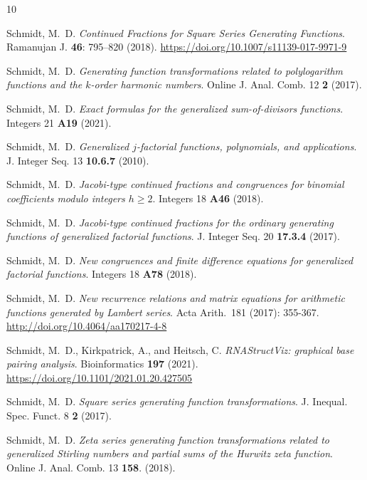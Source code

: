 \documentclass[10pt,reqno,letterpaper]{article}
\theoremstyle{plain}
\numberwithin{theorem}{section}
\theoremstyle{definition}
\newcounter{completeBibitemIncrementCtr}
\renewenvironment{thebibliography}[1]{
     \renewcommand{\refname}{} 
     
     \begin{oldthebibliography}{#1}
     \setlength{\itemsep}{0em}
     \setlength{\parskip}{0em}
     \setlength{\topsep}{0pt}
     \setlength{\partopsep}{0pt}
     \setcounter{enumiv}{\value{completeBibitemIncrementCtr}}
     \footnotesize 
}
{
     \setcounter{completeBibitemIncrementCtr}{\value{enumiv}}
     \end{oldthebibliography}
}
\begin{document}
\begin{thebibliography}{10}
Schmidt, M.~D. \emph{Continued Fractions for Square Series Generating Functions}. 
Ramanujan J. {\bf 46}: 795--820 (2018). 
\url{https://doi.org/10.1007/s11139-017-9971-9}

Schmidt, M.~D. \emph{Generating function transformations related to 
                     polylogarithm functions and the $k$-order harmonic numbers}. 
Online J. Anal. Comb. 12 {\bf 2} (2017). 

Schmidt, M.~D. \emph{Exact formulas for the generalized sum-of-divisors functions}. 
Integers 21 {\bf A19} (2021). 

Schmidt, M.~D. \emph{Generalized $j$-factorial functions, polynomials, and applications}. 
J. Integer Seq. 13 {\bf 10.6.7}  (2010). 

Schmidt, M.~D. \emph{Jacobi-type continued fractions and congruences for 
                     binomial coefficients modulo integers $h \geq 2$}. 
Integers 18 {\bf A46} (2018). 

Schmidt, M.~D. \emph{Jacobi-type continued fractions for the ordinary generating functions of 
                     generalized factorial functions}. 
J. Integer Seq. 20 {\bf 17.3.4} (2017). 

Schmidt, M.~D. \emph{New congruences and finite difference equations for generalized factorial functions}. 
Integers 18 {\bf A78} (2018). 

Schmidt, M.~D. \emph{New recurrence relations and matrix equations for 
                     arithmetic functions generated by Lambert series}. 
Acta Arith. 181 (2017): 355-367. 
\url{http://doi.org/10.4064/aa170217-4-8} 

Schmidt, M.~D., Kirkpatrick, A., and Heitsch, C. \emph{RNAStructViz: graphical base pairing analysis}. 
Bioinformatics {\bf 197} (2021). 
\url{https://doi.org/10.1101/2021.01.20.427505}

Schmidt, M.~D. \emph{Square series generating function transformations}. 
J. Inequal. Spec. Funct. 8 {\bf 2} (2017). 

Schmidt, M.~D. \emph{Zeta series generating function transformations related to 
                     generalized Stirling numbers and partial sums of the Hurwitz zeta function}. 
Online J. Anal. Comb. 13 {\bf 158}. (2018). 

\end{thebibliography}
\end{document}
